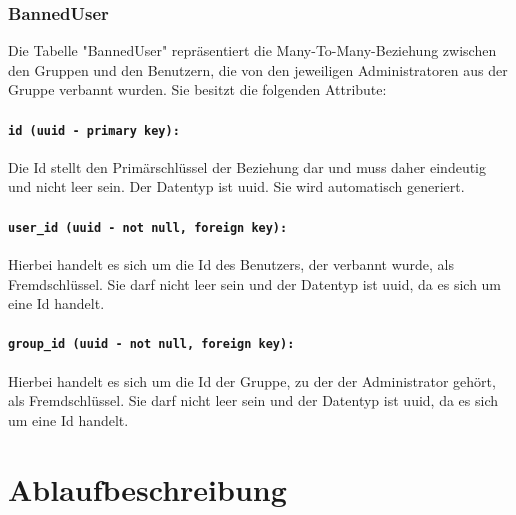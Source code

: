 \documentclass{entwurfsheft}
\begin{document}
\subsubsection{BannedUser}
Die Tabelle "BannedUser" repräsentiert die Many-To-Many-Beziehung zwischen den Gruppen und den Benutzern, die von den jeweiligen Administratoren aus der Gruppe verbannt wurden. Sie besitzt die folgenden Attribute:
\paragraph{\texttt{id (uuid - primary key):}} Die Id stellt den Primärschlüssel der Beziehung dar und muss daher eindeutig und nicht leer sein. Der Datentyp ist \Gls{uuid}. Sie wird automatisch generiert.
\paragraph{\texttt{user\_id (uuid - not null, foreign key):}} Hierbei handelt es sich um die Id des Benutzers, der verbannt wurde, als Fremdschlüssel. Sie darf nicht leer sein und der Datentyp ist \Gls{uuid}, da es sich um eine Id handelt.
\paragraph{\texttt{group\_id (uuid - not null, foreign key):}} Hierbei handelt es sich um die Id der Gruppe, zu der der Administrator gehört, als Fremdschlüssel. Sie darf nicht leer sein und der Datentyp ist \Gls{uuid}, da es sich um eine Id handelt.
\newpage

\section{Ablaufbeschreibung}
\end{document}
